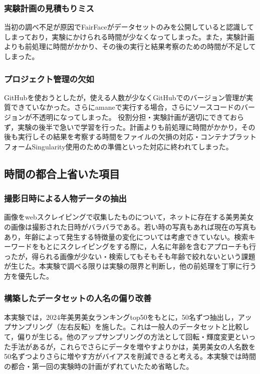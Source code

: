 \documentclass[a4paper,11pt,titlepage]{jsarticle}
\begin{document}
\subsubsection*{実験計画の見積もりミス}
当初の調べ不足が原因でFairFaceがデータセットのみを公開していると認識してしまっており，実験にかけられる時間が少なくなってしまった。また，実験計画よりも前処理に時間がかかり、その後の実行と結果考察のための時間が不足してしまった。

\subsubsection*{プロジェクト管理の欠如}
GitHubを使おうとしたが，使える人数が少なくGitHubでのバージョン管理が実質できていなかった。さらにamaneで実行する場合，さらにソースコードのバージョンが不透明になってしまった。
役割分担・実験計画が適切にできておらず，実験の後半で急いで学習を行った。計画よりも前処理に時間がかかり，その後も実行しその結果を考察する時間をファイルの欠損の対応・コンテナプラットフォームSingularity使用のための準備といった対応に終われてしまった。

\subsection{時間の都合上省いた項目}
\subsubsection*{撮影日時による人物データの抽出}
画像をwebスクレイピングで収集したものについて，ネットに存在する美男美女の画像は撮影された日時がバラバラである。若い時の写真もあれば現在の写真もあり，年齢によって発生する特徴量の変化については考慮できていない。検索キーワードをもとにスクレイピングをする際に，人名に年齢を含むアプローチも行ったが，得られる画像が少ない・検索してもそもそも年齢で絞れないという課題が生じた。本実験で調べる限りは実験の限界と判断し，他の前処理を丁寧に行う方を優先した。

\subsubsection*{構築したデータセットの人名の偏り改善}
本実験では，2024年美男美女ランキングtop50をもとに，50名ずつ抽出し，アップサンプリング（左右反転）を施した。これは一般人のデータセットと比較して，偏りが生じる。他のアップサンプリングの方法として回転・輝度変更といった手法があるが，これらでさらにデータを増やすよりかは，美男美女の人名数を50名ずつよりさらに増やす方がバイアスを削減できると考える。本実験では時間の都合・第一回の実験時の計画がずれていたため省略した。
\end{document}
